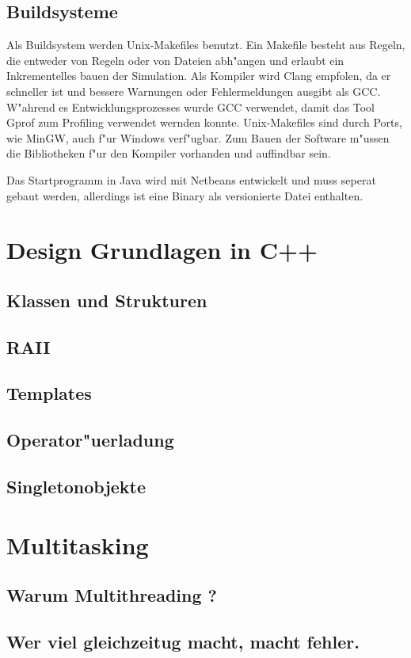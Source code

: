 \documentclass[14pt, a4paper]{report}
\begin{document}
\section{Buildsysteme}
Als Buildsystem werden Unix-Makefiles benutzt. Ein Makefile besteht aus Regeln, die
entweder von Regeln oder von Dateien abh"angen und erlaubt ein Inkrementelles bauen
der Simulation. Als Kompiler wird Clang empfolen, da er schneller ist und bessere
Warnungen oder Fehlermeldungen ausgibt als GCC. W"ahrend es Entwicklungsprozesses 
wurde GCC verwendet, damit das Tool Gprof zum Profiling verwendet wernden konnte.
Unix-Makefiles sind durch Ports, wie MinGW, auch f"ur Windows verf"ugbar. Zum Bauen
der Software m"ussen die Bibliotheken f"ur den Kompiler vorhanden und auffindbar sein.

Das Startprogramm in Java wird mit Netbeans entwickelt und muss seperat gebaut werden,
allerdings ist eine Binary als versionierte Datei enthalten.


\chapter{Design Grundlagen in C++}
\section{Klassen und Strukturen}
\section{RAII} \label{RAII}
\section{Templates}
\section{Operator"uerladung}
\section{Singletonobjekte}

\chapter{Multitasking}
\section{Warum Multithreading ?}
\section{Wer viel gleichzeitug macht, macht fehler.}
\end{document}
